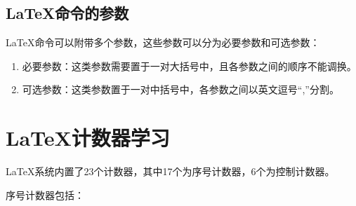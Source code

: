 \subsection{\LaTeX 命令的参数}

\LaTeX 命令可以附带多个参数，这些参数可以分为必要参数和可选参数：

\begin{enumerate}
	\item 必要参数：这类参数需要置于一对大括号中，且各参数之间的顺序不能调换。
	\item 可选参数：这类参数置于一对中括号中，各参数之间以英文逗号“,”分割。
\end{enumerate}


\section{\LaTeX 计数器学习}
\LaTeX 系统内置了23个计数器，其中17个为序号计数器，6个为控制计数器。

序号计数器包括：

